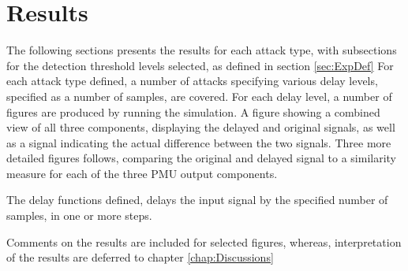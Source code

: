 \chapter{Results} \label{chap:Results}


The following sections presents the results for each attack type, with subsections for the detection threshold levels selected, as defined in section \ref{sec:ExpDef} 
For each attack type defined, a number of attacks specifying various delay levels, specified as a number of samples, are covered.
For each delay level, a number of figures are produced by running the simulation.
A figure showing a combined view of all three components, displaying the delayed and original signals, as well as a signal indicating the actual difference between the two signals.  Three more detailed figures follows, comparing the original and delayed signal to a similarity measure for each of the three PMU output components.

The delay functions defined, delays the input signal by the specified number of samples, in one or more steps.


Comments on the results are included for selected figures, whereas, interpretation of the results are deferred to chapter \ref{chap:Discussions}

%





%

%

%

